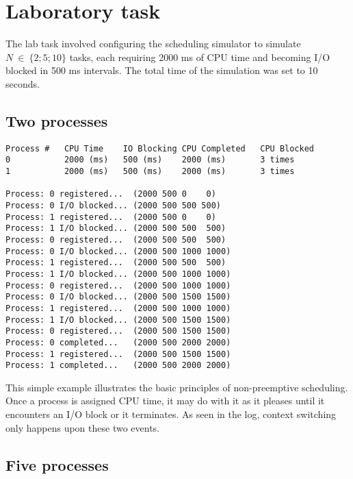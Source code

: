 \documentclass{article}
\begin{document}
    \section{Laboratory task}
    
    The lab task involved configuring the scheduling simulator to simulate
    $N~\in~\{2;5;10\}$ tasks, each requiring 2000 ms of CPU time and becoming
    I/O blocked in 500 ms intervals. The total time of the simulation was set
    to 10 seconds.
    
    \subsection{Two processes}
    
    \begin{verbatim}
Process #   CPU Time    IO Blocking CPU Completed   CPU Blocked
0           2000 (ms)   500 (ms)    2000 (ms)       3 times
1           2000 (ms)   500 (ms)    2000 (ms)       3 times

Process: 0 registered...  (2000 500 0    0)
Process: 0 I/O blocked... (2000 500 500 500)
Process: 1 registered...  (2000 500 0    0)
Process: 1 I/O blocked... (2000 500 500  500)
Process: 0 registered...  (2000 500 500  500)
Process: 0 I/O blocked... (2000 500 1000 1000)
Process: 1 registered...  (2000 500 500  500)
Process: 1 I/O blocked... (2000 500 1000 1000)
Process: 0 registered...  (2000 500 1000 1000)
Process: 0 I/O blocked... (2000 500 1500 1500)
Process: 1 registered...  (2000 500 1000 1000)
Process: 1 I/O blocked... (2000 500 1500 1500)
Process: 0 registered...  (2000 500 1500 1500)
Process: 0 completed...   (2000 500 2000 2000)
Process: 1 registered...  (2000 500 1500 1500)
Process: 1 completed...   (2000 500 2000 2000)
    \end{verbatim}
	
	This simple example illustrates the basic principles of non-preemptive
	scheduling. Once a process is assigned CPU time, it may do with it as it
	pleases until it encounters an I/O block or it terminates. As seen in the
	log, context switching only happens upon these two events.
	
	\subsection{Five processes}
	
\end{document}
